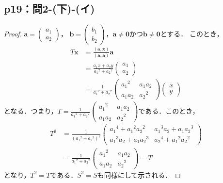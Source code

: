 \documentclass[a4paper,10pt,fleqn]{ltjsarticle}
\begin{document}
\subsection*{p19：問2-(下)-(イ)}
\begin{leftbar}
  \begin{proof}
    $\bm{a}=
      \begin{pmatrix}
        a_1 \\
        a_2
      \end{pmatrix}
    $，
    $\bm{b}=
      \begin{pmatrix}
        b_1 \\
        b_2
      \end{pmatrix}
    $，$\bm{a} \ne \bm{0}$かつ$\bm{b} \ne \bm{0}$とする．
    このとき，
    \begin{align*}
      T \bm{x} & =\frac{(\bm{a},\bm{x})}{(\bm{a},\bm{a})} \bm{a} \\
               & = \frac{a_1 x + a_2 y}{{a_1}^2+{a_2}^2}
      \begin{pmatrix}
        a_1 \\
        a_2
      \end{pmatrix}
      \\
               & =
      \frac{1}{{a_1}^2+{a_2}^2}
      \begin{pmatrix}
        {a_1}^2 & a_1 a_2 \\
        a_1 a_2 & {a_2}^2
      \end{pmatrix}
      \begin{pmatrix}
        x \\
        y
      \end{pmatrix}
    \end{align*}
    となる．つまり，$T=\frac{1}{{a_1}^2+{a_2}^2}
      \begin{pmatrix}
        {a_1}^2 & a_1 a_2 \\
        a_1 a_2 & {a_2}^2
      \end{pmatrix}
    $である．このとき，
    \begin{align*}
      T^2 & = \frac{1}{({a_1}^2+{a_2}^2)^2}
      \begin{pmatrix}
        {a_1}^4 + {a_1}^2 {a_2}^2 & {a_1}^3 a_2 + a_1 {a_2}^3 \\
        {a_1}^3 a_2 + a_1 {a_2}^3 & {a_2}^4 + {a_1}^2 {a_2}^2
      \end{pmatrix}
      \\
          & = \frac{1}{{a_1}^2+{a_2}^2}
      \begin{pmatrix}
        {a_1}^2 & a_1 a_2 \\
        a_1 a_2 & {a_2}^2
      \end{pmatrix}
      =T
    \end{align*}
    となり，$T^2=T$である．$S^2=S$も同様にして示される．
  \end{proof}
\end{leftbar}
\end{document}

